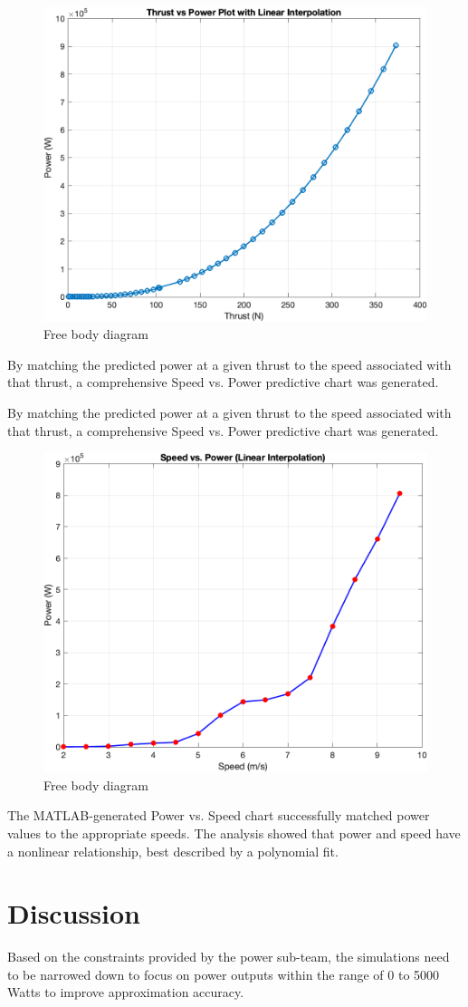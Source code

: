 \documentclass{article}
\begin{document}
\begin{figure}[h!]
    \centering
    \includegraphics[width=0.5\linewidth]{Linear Interpolation Thrust vs Power.png}
    \caption{Free body diagram}
    \label{fig:Thrust vs Power Graph}
\end{figure}

\FloatBarrier %

By matching the predicted power at a given thrust to the speed associated with that thrust, a comprehensive Speed vs. Power predictive chart was generated.

By matching the predicted power at a given thrust to the speed associated with that thrust, a comprehensive Speed vs. Power predictive chart was generated.
\begin{figure}[h!]
    \centering
    \includegraphics[width=0.5\linewidth]{Linear Interpolation Speed vs Power.png}
    \caption{Free body diagram}
    \label{fig: Speed vs Power Graph}
\end{figure}
The MATLAB-generated Power vs. Speed chart successfully matched power values to the appropriate speeds. The analysis showed that power and speed have a nonlinear relationship, best described by a polynomial fit.


\section{Discussion}
Based on the constraints provided by the power sub-team, the simulations need to be narrowed down to focus on power outputs within the range of 0 to 5000 Watts to improve approximation accuracy.
\end{document}
